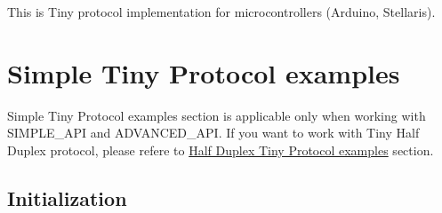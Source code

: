 This is Tiny protocol implementation for microcontrollers (Arduino, Stellaris).\hypertarget{arduino_arduino_tiny}{}\section{Simple Tiny Protocol examples}\label{arduino_arduino_tiny}
Simple Tiny Protocol examples section is applicable only when working with S\+I\+M\+P\+L\+E\+\_\+\+A\+PI and A\+D\+V\+A\+N\+C\+E\+D\+\_\+\+A\+PI. If you want to work with Tiny Half Duplex protocol, please refere to \hyperlink{arduino_arduino_tiny_hd}{Half Duplex Tiny Protocol examples} section.\hypertarget{arduino_arduino_tiny_init}{}\subsection{Initialization}\label{arduino_arduino_tiny_init}

